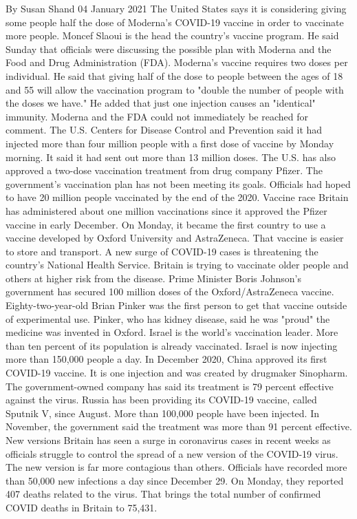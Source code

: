 By Susan Shand
04 January 2021
The United States says it is considering giving some people half the dose of Moderna's COVID-19 vaccine in order to vaccinate more people.
Moncef Slaoui is the head the country's vaccine program. He said Sunday that officials were discussing the possible plan with Moderna and the Food and Drug Administration (FDA). Moderna's vaccine requires two doses per individual.
He said that giving half of the dose to people between the ages of 18 and 55 will allow the vaccination program to "double the number of people with the doses we have."
He added that just one injection causes an "identical" immunity.
Moderna and the FDA could not immediately be reached for comment.
The U.S. Centers for Disease Control and Prevention said it had injected more than four million people with a first dose of vaccine by Monday morning. It said it had sent out more than 13 million doses.
The U.S. has also approved a two-dose vaccination treatment from drug company Pfizer.
The government's vaccination plan has not been meeting its goals. Officials had hoped to have 20 million people vaccinated by the end of the 2020.
Vaccine race
Britain has administered about one million vaccinations since it approved the Pfizer vaccine in early December. On Monday, it became the first country to use a vaccine developed by Oxford University and AstraZeneca. That vaccine is easier to store and transport.
A new surge of COVID-19 cases is threatening the country's National Health Service. Britain is trying to vaccinate older people and others at higher risk from the disease. Prime Minister Boris Johnson's government has secured 100 million doses of the Oxford/AstraZeneca vaccine.
Eighty-two-year-old Brian Pinker was the first person to get that vaccine outside of experimental use.
Pinker, who has kidney disease, said he was "proud" the medicine was invented in Oxford.
Israel is the world's vaccination leader. More than ten percent of its population is already vaccinated. Israel is now injecting more than 150,000 people a day.
In December 2020, China approved its first COVID-19 vaccine. It is one injection and was created by drugmaker Sinopharm. The government-owned company has said its treatment is 79 percent effective against the virus.
Russia has been providing its COVID-19 vaccine, called Sputnik V, since August. More than 100,000 people have been injected. In November, the government said the treatment was more than 91 percent effective.
New versions
Britain has seen a surge in coronavirus cases in recent weeks as officials struggle to control the spread of a new version of the COVID-19 virus. The new version is far more contagious than others. Officials have recorded more than 50,000 new infections a day since December 29. On Monday, they reported 407 deaths related to the virus. That brings the total number of confirmed COVID deaths in Britain to 75,431.

